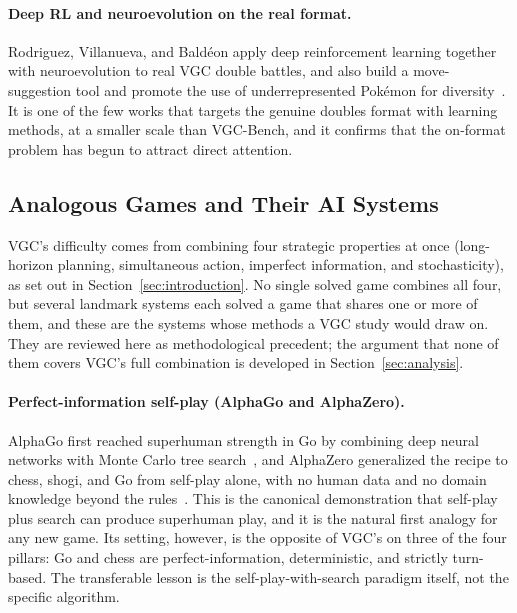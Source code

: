 \paragraph{Deep RL and neuroevolution on the real format.}
Rodriguez, Villanueva, and Bald\'{e}on apply deep reinforcement learning together
with neuroevolution to real VGC double battles, and also build a move-suggestion
tool and promote the use of underrepresented Pok\'{e}mon for
diversity~\cite{rodriguez2024neuroevolution}. It is one of the few works that
targets the genuine doubles format with learning methods, at a smaller scale than
VGC-Bench, and it confirms that the on-format problem has begun to attract direct
attention.

\subsection{Analogous Games and Their AI Systems}
\label{subsec:app_analogous}

VGC's difficulty comes from combining four strategic properties at once
(long-horizon planning, simultaneous action, imperfect information, and
stochasticity), as set out in Section~\ref{sec:introduction}. No single solved
game combines all four, but several landmark systems each solved a game that
shares one or more of them, and these are the systems whose methods a VGC study
would draw on. They are reviewed here as methodological precedent; the argument
that none of them covers VGC's full combination is developed in
Section~\ref{sec:analysis}.

\paragraph{Perfect-information self-play (AlphaGo and AlphaZero).}
AlphaGo first reached superhuman strength in Go by combining deep neural networks
with Monte Carlo tree search~\cite{silver2016alphago}, and AlphaZero generalized
the recipe to chess, shogi, and Go from self-play alone, with no human data and
no domain knowledge beyond the rules~\cite{silver2018alphazero}. This is the
canonical demonstration that self-play plus search can produce superhuman play,
and it is the natural first analogy for any new game. Its setting, however, is the
opposite of VGC's on three of the four pillars: Go and chess are
perfect-information, deterministic, and strictly turn-based. The transferable
lesson is the self-play-with-search paradigm itself, not the specific algorithm.

